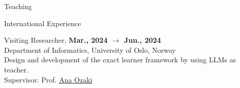 \documentclass{resume} %
\begin{document}
\begin{rSection}{Teaching}
        \begin{rSubsection}{International Experience}{}{}{}

            \item Visiting Researcher, \textbf{Mar., 2024 $\rightarrow$ Jun., 2024}
            \\Department of Informatics, University of Oslo, Norway
            \\Design and development of the exact learner framework by using LLMs as teacher.
            \\Supervisor: Prof. \href{mailto:anaoz@ifi.uio.no}{Ana Ozaki}

        \end{rSubsection}

    \end{rSection}

\end{document}
